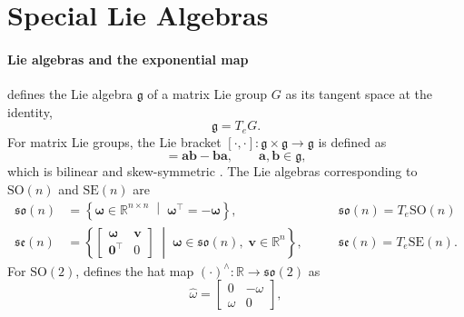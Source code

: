 \section{Special Lie Algebras}
\label{sec:special_lie_algebras}

\paragraph{Lie algebras and the exponential map}
\cite{Hall2000LieGroups} defines the Lie algebra \(\mathfrak{g}\) of a matrix Lie group \(G\) as its tangent space at the identity,
\begin{equation}
    \mathfrak{g}=T_{e}G.
    \label{eq:lie_algebra_tangent_space}
\end{equation}
For matrix Lie groups, the Lie bracket $[\cdot,\cdot]: \mathfrak{g} \times \mathfrak{g} \to \mathfrak{g}$ 
is defined as
\begin{equation}
    [\bm{a},\bm{b}]
    =
    \bm{a}\bm{b}-\bm{b}\bm{a},
    \qquad
    \bm{a},\bm{b}\in\mathfrak{g},
    \label{eq:matrix_lie_bracket}
\end{equation}
which is bilinear and skew-symmetric \cite{Hall2000LieGroups}. The Lie algebras corresponding to \(\mathrm{SO}(n)\) and \(\mathrm{SE}(n)\) are
\begin{align}
    \mathfrak{so}(n)
    &=
    \left\{
        \bm{\omega}\in\mathbb{R}^{n\times n}
        \;\middle|\;
        \bm{\omega}^{\top}=-\bm{\omega}
    \right\}
    \label{eq:so_algebra},
    \qquad
    &\mathfrak{so}(n) = T_{e}\mathrm{SO}(n)
    \\
    \mathfrak{se}(n)
    &=
    \left\{
        \begin{bmatrix}
            \bm{\omega} & \bm{v}\\
            \bm{0}^{\top} & 0
        \end{bmatrix}
        \;\middle|\;
        \bm{\omega}\in\mathfrak{so}(n),\;
        \bm{v}\in\mathbb{R}^{n}
    \right\},
    \qquad
    &\mathfrak{se}(n) = T_{e}\mathrm{SE}(n).
    \label{eq:se_algebra}
\end{align}
For \(\mathrm{SO}(2)\), \cite{Lee2008} defines the hat map $(\cdot)^\wedge: \mathbb{R} \rightarrow \mathfrak{so}(2)$ as
\begin{equation}
    \widehat{\omega}
    =
    \begin{bmatrix}
        0 & -\omega\\
        \omega & 0
    \end{bmatrix},
    \label{eq:hat_map_so2}
\end{equation}
